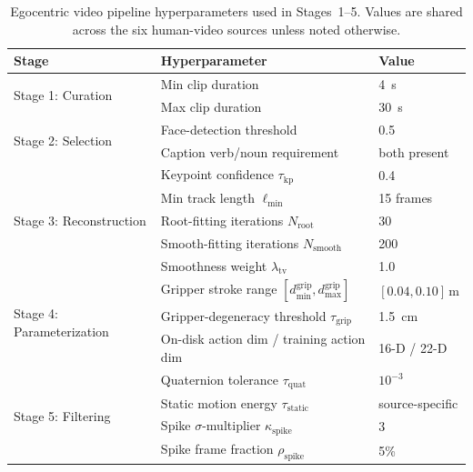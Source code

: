 \documentclass{llmxive}
\providecommand{\arraystretch}{1.1}
\begin{document}
\begin{table}[!t]
\centering
\small
\renewcommand{\arraystretch}{1.1}
\begin{tabular}{lll}
\toprule
\textbf{Stage} & \textbf{Hyperparameter} & \textbf{Value} \\
\midrule
\multirow[t]{2}{*}{Stage 1: Curation}
  & Min clip duration                               & 4~s \\
  & Max clip duration                               & 30~s \\
\midrule
\multirow[t]{2}{*}{Stage 2: Selection}
  & Face-detection threshold                        & 0.5 \\
  & Caption verb/noun requirement                   & both present \\
\midrule
\multirow[t]{5}{*}{Stage 3: Reconstruction}
  & Keypoint confidence $\tau_{\mathrm{kp}}$        & 0.4 \\
  & Min track length $\ell_{\min}$                  & 15 frames \\
  & Root-fitting iterations $N_{\mathrm{root}}$     & 30 \\
  & Smooth-fitting iterations $N_{\mathrm{smooth}}$ & 200 \\
  & Smoothness weight $\lambda_{\mathrm{tv}}$       & 1.0 \\
\midrule
\multirow[t]{3}{*}{Stage 4: Parameterization}
  & Gripper stroke range $[d_{\min}^{\mathrm{grip}}, d_{\max}^{\mathrm{grip}}]$ & $[0.04, 0.10]\,\mathrm{m}$ \\
  & Gripper-degeneracy threshold $\tau_{\mathrm{grip}}$ & 1.5~cm \\
  & On-disk action dim / training action dim        & 16-D / 22-D \\
\midrule
\multirow[t]{4}{*}{Stage 5: Filtering}
  & Quaternion tolerance $\tau_{\mathrm{quat}}$     & $10^{-3}$ \\
  & Static motion energy $\tau_{\mathrm{static}}$   & source-specific \\
  & Spike $\sigma$-multiplier $\kappa_{\mathrm{spike}}$ & 3 \\
  & Spike frame fraction $\rho_{\mathrm{spike}}$    & 5\% \\
\bottomrule
\end{tabular}
\caption{Egocentric video pipeline hyperparameters used in Stages~1--5. Values are shared across the six human-video sources
unless noted otherwise.}
\label{tab:egocentric-pipeline-hparams}
\end{table}
\end{document}
